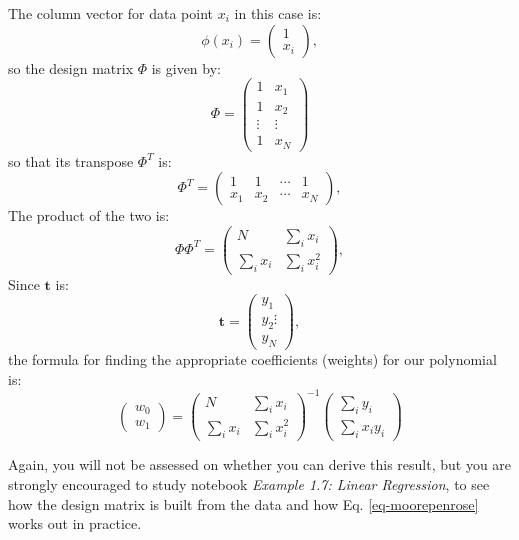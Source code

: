   The column vector for data point $x_i$ in this case is:
  $$
  \phi(x_i) = \left( \begin{array}{c} 1 \\ x_i \end{array} \right),
  $$
  so the design matrix $\Phi$ is given by:
  $$
  \Phi = \left( \begin{array}{cc} 1 & x_1 \\ 1 & x_2 \\ \vdots & \vdots \\ 1 & x_N \end{array} \right)
  $$
  so that its transpose $\Phi^T$ is:
   $$
  \Phi^T = \left( \begin{array}{cccc} 1 & 1 & \cdots & 1 \\ x_1 & x_2 & \cdots & x_N \end{array} \right),
  $$
  The product of the two is:
  \begin{equation}
    \Phi \Phi^T  = \left( \begin{array}{cc} N & \sum_i x_i \\ \sum_i x_i & \sum_i x^2_i \end{array} \right), 
   \end{equation}
  Since $\boldsymbol{t}$ is:
  $$
  \boldsymbol{t} = \left( \begin{array}{c} y_1 \\ y_2 \vdots \\y_N \end{array} \right),
  $$
  the formula for finding the appropriate coefficients (weights) for our polynomial is:
  \begin{equation}
    \left(  \begin{array}{c} w_0 \\ w_1 \end{array} \right)  =
    \left( \begin{array}{cc} N & \sum_i x_i \\ \sum_i x_i & \sum_i x^2_i \end{array} \right)^{-1} \left( \begin{array}{c} \sum_i y_i \\ \sum_i x_iy_i  \end{array} \right)
  \end{equation}

  
  Again, you will not be assessed on whether you can derive this result, but you are
  strongly encouraged to study notebook \emph{Example 1.7: Linear Regression}, to
  see how the design matrix is built from the data and how Eq. \ref{eq-moorepenrose}
  works out in practice.

